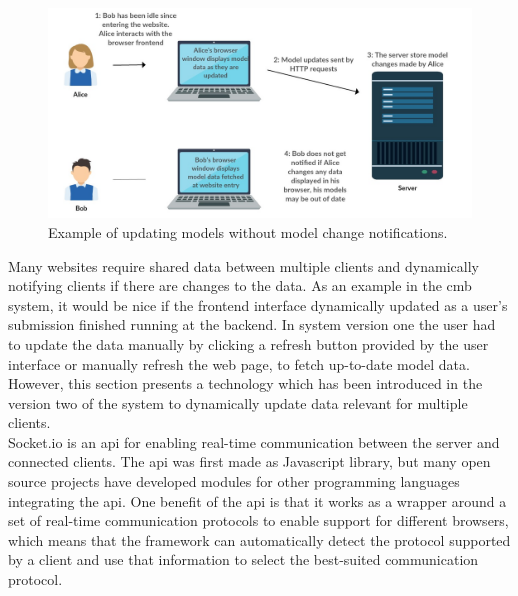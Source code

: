 \begin{figure}
    \centering
    \includegraphics[width=1\textwidth]{figs/update_problem.jpg}
    \caption{Example of updating models without model change notifications.}
    \label{fig:update-problem}
\end{figure}

Many websites require shared data between multiple clients and dynamically notifying clients if there are changes to the data. As an example in the \gls{cmb} system, it would be nice if the frontend interface dynamically updated as a user’s submission finished running at the backend. In system version one the user had to update the data manually by clicking a refresh button provided by the user interface or manually refresh the web page, to fetch up-to-date model data. However, this section presents a technology which has been introduced in the version two of the system to dynamically update data relevant for multiple clients. \\

Socket.io \cite{SOCKETIO} is an \gls{api} for enabling real-time communication between the server and connected clients. The \gls{api} was first made as Javascript library, but many open source projects have developed modules for other programming languages integrating the \gls{api}. One benefit of the \gls{api} is that it works as a wrapper around a set of real-time communication protocols to enable support for different browsers, which means that the framework can automatically detect the protocol supported by a client and use that information to select the best-suited communication protocol. \\

